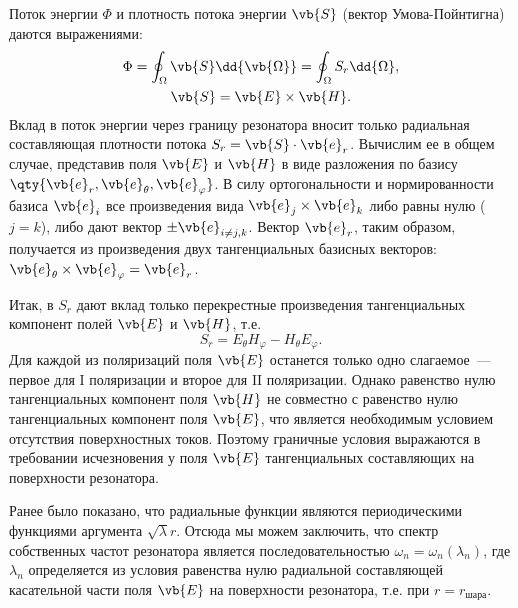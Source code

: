     Поток энергии $\Phi$ и плотность потока энергии $\vb{S}$ (вектор Умова-Пойнтигна) даются выражениями:
    \begin{equation}\begin{gathered}
        \Phi = \oint_\Omega \vb{S} \dd{\vb{\Omega}}
                = \oint_\Omega S_r \dd{\Omega} , \\
        \vb{S} = \vb{E} \times \vb{H} .
    \end{gathered}\end{equation}
    Вклад в поток энергии через границу резонатора вносит только радиальная составляющая плотности потока $S_r = \vb{S} \cdot \vb{e}_r$. Вычислим ее в общем случае, представив поля $\vb{E}$ и $\vb{H}$ в виде разложения по базису $\qty{ \vb{e}_r, \vb{e}_\theta, \vb{e}_\varphi }$. В силу ортогональности и нормированности базиса $\vb{e}_i$ все произведения вида $\vb{e}_j \times \vb{e}_k$ либо равны нулю ($j = k$), либо дают вектор $\pm \vb{e}_{i \neq j,k}$. Вектор $\vb{e}_r$, таким образом, получается из произведения двух тангенциальных базисных векторов: $\vb{e}_\theta \times \vb{e}_\varphi = \vb{e}_r$.

    Итак, в $S_r$ дают вклад только перекрестные произведения тангенциальных компонент полей $\vb{E}$ и $\vb{H}$, т.е.
    \begin{equation}
        S_r = E_\theta H_\varphi - H_\theta E_\varphi .
    \end{equation}
    Для каждой из поляризаций поля $\vb{E}$ останется только одно слагаемое~--- первое для $\mathrm{I}$ поляризации и второе для $\mathrm{II}$ поляризации. Однако равенство нулю тангенциальных компонент поля $\vb{H}$ не совместно с равенство нулю тангенциальных компонент поля $\vb{E}$, что является необходимым условием отсутствия поверхностных токов. Поэтому граничные условия выражаются в требовании исчезновения у поля $\vb{E}$ тангенциальных составляющих на поверхности резонатора.

    Ранее было показано, что радиальные функции являются периодическими функциями аргумента $\sqrt\lambda r$. Отсюда мы можем заключить, что спектр собственных частот резонатора является последовательностью $\omega_n = \omega_n(\lambda_n)$, где $\lambda_n$ определяется из условия равенства нулю радиальной составляющей касательной части поля $\vb{E}$ на поверхности резонатора, т.е. при $r = r_\text{шара}$.
